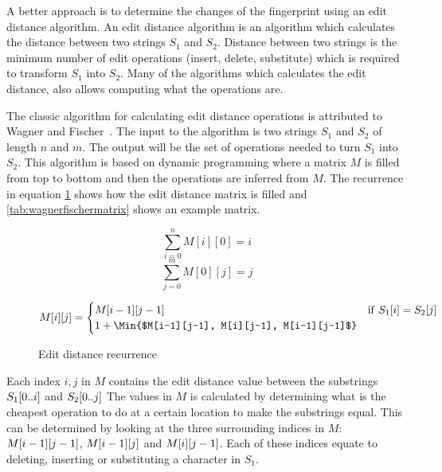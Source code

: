 A better approach is to determine the changes of the fingerprint using an edit distance
algorithm. An edit distance algorithm is an algorithm which calculates the distance
between two strings $S_1$ and $S_2$. Distance between two strings is the minimum number of
edit operations (insert, delete, substitute) which is required to transform $S_1$ into
$S_2$. Many of the algorithms which calculates the edit distance, also allows computing
what the operations are.

The classic algorithm for calculating edit distance operations is attributed to Wagner and
Fischer~\cite{WagnerFischer}. The input to the algorithm is two strings $S_1$ and $S_2$ of
length $n$ and $m$. The output will be the set of operations needed to turn $S_1$ into
$S_2$. This algorithm is based on dynamic programming where a matrix $M$ is filled from
top to bottom and then the operations are inferred from $M$. The recurrence in equation
\ref{eq:editdistancerecurrence} shows how the edit distance matrix is filled and
\ref{tab:wagnerfischermatrix} shows an example matrix.

\begin{figure}[t]
    \begin{center}
	$$
		\sum^{n}_{i = 0}{M[i][0] = i}
	$$
	$$
		\sum^{m}_{j = 0}{M[0][j] = j}
	$$

	\begin{gather*}
		M[i][j] =
		\begin{cases}
			M[i-1][j-1] & \mathrm{if\ } S_1[i] = S_2[j] \\
            1 + \Min{$M[i-1][j-1], M[i][j-1], M[i-1][j-1]$}
		\end{cases}
	\end{gather*}
	\caption{Edit distance recurrence}
	\label{eq:editdistancerecurrence}
    \end{center}
\end{figure}

Each index $i, j$ in $M$ contains the edit distance value between the substrings
$S_1[{0..i}]$ and $S_2[{0..j}]$ The values in $M$ is calculated by
determining what is the cheapest operation to do at a certain location to make the
substrings equal. This can be determined by looking at the three surrounding indices in
$M$: $M[{i - 1}][{j - 1}]$, $M[{i - 1}][{j}]$ and
$M[{i}][{j - 1}]$. Each of these indices equate to deleting, inserting or
substituting a character in $S_1$. 

